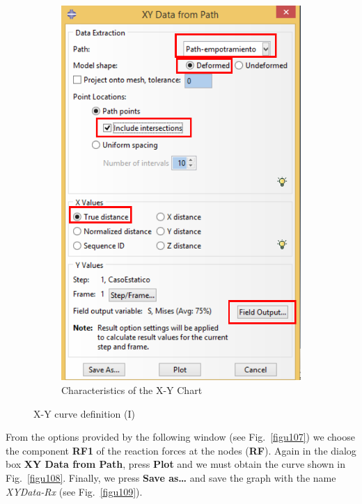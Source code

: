 \begin{enumerate}
\begin{figure}[H]
\begin{subfigure}{0.39\textwidth}
    \includegraphics[width=\textwidth]{./body/images/imagen106.pdf}
    \caption{Characteristics of the X-Y Chart}
    \label{figu106}
  \end{subfigure}%
  \caption{X-Y curve definition (I)}
\end{figure}

From the options provided by the following window (see
Fig.~\ref{figu107}) we choose the component \textbf{RF1} of the
reaction forces at the nodes (\textbf{RF}).  Again in the dialog box
\textbf{XY Data from Path}, press \textbf{Plot} and we must obtain the
curve shown in Fig.~\ref{figu108}. Finally, we press \textbf {Save
  as\ldots} and save the graph with the name \textit{XYData-Rx} (see
Fig.~\ref{figu109}).



\end{enumerate}
